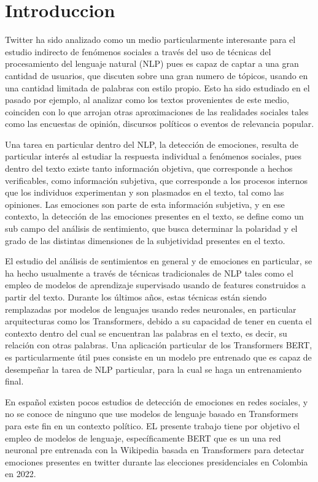 \chapter{Introduccion}


Twitter ha sido analizado como un medio particularmente interesante para el estudio indirecto de fenómenos sociales a través del uso de técnicas del procesamiento del lenguaje natural (NLP) pues es capaz de captar a una gran cantidad de usuarios, que discuten sobre una gran numero de tópicos, usando en una cantidad limitada de palabras con estilo propio. Esto ha sido estudiado en el pasado por ejemplo, al analizar como los textos provenientes de este medio, coinciden con lo que arrojan otras aproximaciones de las realidades sociales tales como las encuestas de opinión, discursos políticos o eventos de relevancia popular. 

Una tarea en particular dentro del NLP,  la detección de emociones, resulta de particular interés al estudiar la respuesta individual a fenómenos sociales, pues dentro del texto existe tanto información objetiva, que corresponde a hechos verificables, como información subjetiva, que corresponde a los procesos internos que los individuos experimentan y son plasmados en el texto, tal como las opiniones. 
Las emociones son parte de esta información subjetiva, y en ese contexto, la detección de las emociones presentes en el texto, se define como un sub campo del análisis de sentimiento, que busca determinar la polaridad y el grado de las distintas dimensiones de la subjetividad presentes en el texto.


El estudio del análisis de sentimientos en general y de emociones en particular, se ha hecho usualmente a través de técnicas tradicionales de NLP tales como el empleo de modelos de aprendizaje supervisado usando de features construidos a partir del texto.
Durante los últimos años, estas técnicas están siendo remplazadas por modelos de lenguajes usando redes neuronales, en particular arquitecturas como los Transformers, debido a su capacidad de tener en cuenta el contexto dentro del cual se encuentran las palabras en el texto, es decir, su relación con otras palabras. Una aplicación particular de los Transformers BERT, es particularmente útil pues consiste en un modelo pre entrenado que es capaz de desempeñar la tarea de NLP particular, para la cual se haga un entrenamiento final.

En español existen pocos estudios de detección de emociones en redes sociales, y no se conoce de ninguno que use modelos de lenguaje basado en Transformers para este fin en un contexto político.
EL presente  trabajo tiene por objetivo el empleo de modelos de lenguaje, específicamente  BERT que es un una red neuronal pre entrenada con la Wikipedia basada en Transformers para detectar emociones presentes en twitter durante las elecciones presidenciales en Colombia en 2022. 

